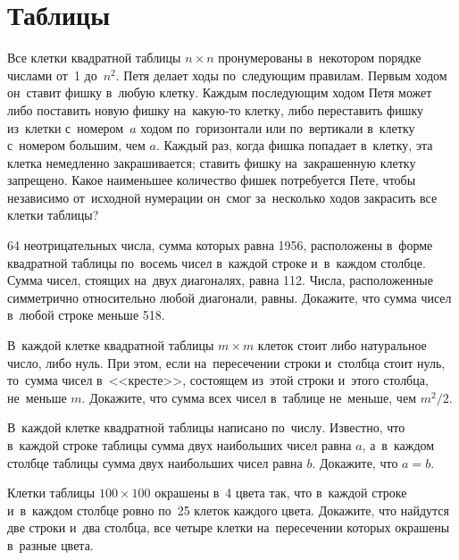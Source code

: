 

\section*{Таблицы}


\begin{problems}

\item
Все клетки квадратной таблицы $n \times n$ пронумерованы в~некотором порядке
числами от~1 до~$n^2$.
Петя делает ходы по~следующим правилам.
Первым ходом он~ставит фишку в~любую клетку.
Каждым последующим ходом Петя может либо поставить новую фишку на~какую-то
клетку, либо переставить фишку из~клетки с~номером~$a$ ходом по~горизонтали или
по~вертикали в~клетку с~номером большим, чем $a$.
Каждый раз, когда фишка попадает в~клетку, эта клетка немедленно закрашивается;
ставить фишку на~закрашенную клетку запрещено.
Какое наименьшее количество фишек потребуется Пете, чтобы независимо
от~исходной нумерации он~смог за~несколько ходов закрасить все клетки таблицы?

\item
64 неотрицательных числа, сумма которых равна 1956, расположены в~форме
квадратной таблицы по~восемь чисел в~каждой строке и~в~каждом столбце.
Сумма чисел, стоящих на~двух диагоналях, равна 112.
Числа, расположенные симметрично относительно любой диагонали, равны.
Докажите, что сумма чисел в~любой строке меньше 518.

\item
В~каждой клетке квадратной таблицы $m \times m$ клеток стоит либо натуральное
число, либо нуль.
При этом, если на~пересечении строки и~столбца стоит нуль, то~сумма чисел
в~<<кресте>>, состоящем из~этой строки и~этого столбца, не~меньше $m$.
Докажите, что сумма всех чисел в~таблице не~меньше, чем $m^2 / 2$.

\item
В~каждой клетке квадратной таблицы написано по~числу.
Известно, что в~каждой строке таблицы сумма двух наибольших чисел равна $a$,
а~в~каждом столбце таблицы сумма двух наибольших чисел равна $b$.
Докажите, что $a = b$.

\item
Клетки таблицы $100 \times 100$ окрашены в~4 цвета так, что в~каждой строке
и~в~каждом столбце ровно по~25 клеток каждого цвета.
Докажите, что найдутся две строки и~два столбца, все четыре клетки
на~пересечении которых окрашены в~разные цвета.


\end{problems}
